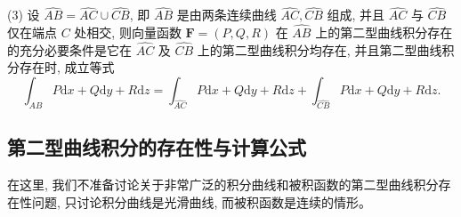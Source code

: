 \documentclass[UTF8,12pt,a4paper,fontset=fandol]{ctexart}
\begin{document}
\begin{definition}
(3) 设 $\widehat{AB}=\widehat{AC}\cup\widehat{CB}$, 即 $\widehat{AB}$ 是由两条连续曲线 $\widehat{AC},\widehat{CB}$ 组成, 并且 $\widehat{AC}$ 与 $\widehat{CB}$ 仅在端点 $C$ 处相交, 则向量函数 $\boldsymbol F=(P,Q,R)$ 在 $\widehat{AB}$ 上的第二型曲线积分存在的充分必要条件是它在 $\widehat{AC}$ 及 $\widehat{CB}$ 上的第二型曲线积分均存在, 并且第二型曲线积分存在时, 成立等式
\[
  \int_{\widehat{AB}}P\mathrm dx+Q\mathrm dy+R\mathrm dz
  =\int_{\widehat{AC}}P\mathrm dx+Q\mathrm dy+R\mathrm dz
  +\int_{\widehat{CB}}P\mathrm dx+Q\mathrm dy+R\mathrm dz.
\]

\end{definition}
\subsection{第二型曲线积分的存在性与计算公式}

在这里, 我们不准备讨论关于非常广泛的积分曲线和被积函数的第二型曲线积分存在性问题, 只讨论积分曲线是光滑曲线, 而被积函数是连续的情形。
\end{document}
